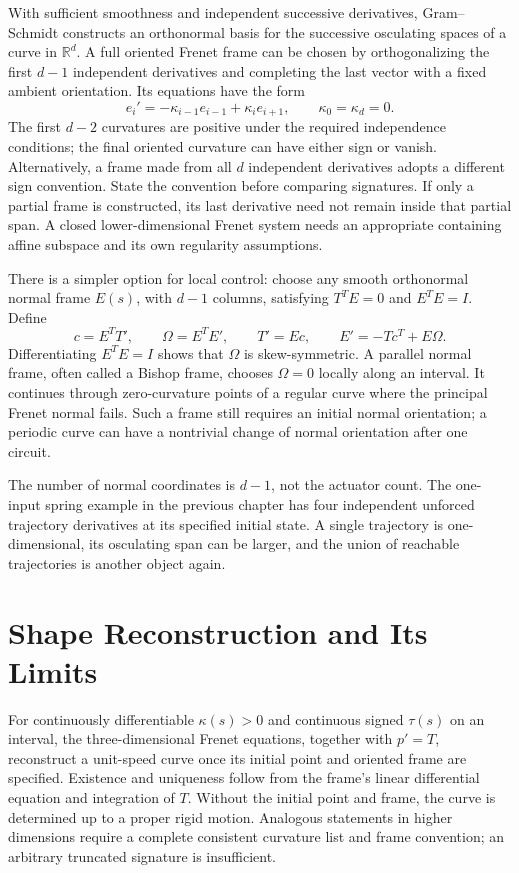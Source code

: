 \documentclass[12pt, openany]{book}
\theoremstyle{plain}
\begin{document}
With sufficient smoothness and independent successive derivatives,
Gram--Schmidt constructs an orthonormal basis for the successive osculating
spaces of a curve in $\mathbb R^d$. A full oriented Frenet frame can be chosen
by orthogonalizing the first $d-1$ independent derivatives and completing the
last vector with a fixed ambient orientation. Its equations have the form
\begin{equation}
 e_i'=-\kappa_{i-1}e_{i-1}+\kappa_i e_{i+1},
 \qquad \kappa_0=\kappa_d=0.
\end{equation}
The first $d-2$ curvatures are positive under the required independence
conditions; the final oriented curvature can have either sign or vanish.
Alternatively, a frame made from all $d$ independent derivatives adopts a
different sign convention. State the convention before comparing signatures.
If only a partial frame is constructed, its last derivative need not remain
inside that partial span. A closed lower-dimensional Frenet system needs an
appropriate containing affine subspace and its own regularity assumptions.

There is a simpler option for local control: choose any smooth orthonormal
normal frame $E(s)$, with $d-1$ columns, satisfying
$T^TE=0$ and $E^TE=I$. Define
\begin{equation}
 c=E^TT',\qquad \Omega=E^TE',\qquad
 T'=Ec,\qquad E'=-Tc^T+E\Omega.
\end{equation}
Differentiating $E^TE=I$ shows that $\Omega$ is skew-symmetric. A parallel
normal frame, often called a Bishop frame, chooses $\Omega=0$ locally along
an interval. It continues through zero-curvature points of a regular curve
where the principal Frenet normal fails. Such a frame still requires an
initial normal orientation; a periodic curve can have a nontrivial change
of normal orientation after one circuit.

The number of normal coordinates is $d-1$, not the actuator count. The
one-input spring example in the previous chapter has four independent
unforced trajectory derivatives at its specified initial state. A single
trajectory is one-dimensional, its osculating span can be larger, and the
union of reachable trajectories is another object again.

\section{Shape Reconstruction and Its Limits}

For continuously differentiable $\kappa(s)>0$ and continuous signed
$\tau(s)$ on an interval,
the three-dimensional Frenet equations, together with $p'=T$, reconstruct a
unit-speed curve once its initial point and oriented frame are specified.
Existence and uniqueness follow from the frame's linear differential
equation and integration of $T$. Without the initial point and frame, the
curve is determined up to a proper rigid motion. Analogous statements in
higher dimensions require a complete consistent curvature list and frame
convention; an arbitrary truncated signature is insufficient.
\end{document}
